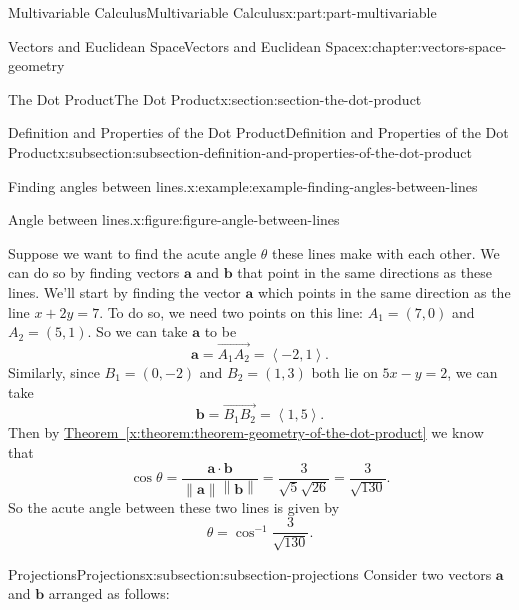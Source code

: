 \documentclass[twoside,10pt,]{tufte-book}
\newcommand{\xreffont}{\relax}
\numberwithin{equation}{part}
\newcommand{\norm}[1]{\left\| #1 \right\|}
\newcommand{\dotprod}[1]{\left\langle #1 \right\rangle}
\begin{document}
\begin{partptx}{Multivariable Calculus}{}{Multivariable Calculus}{}{}{x:part:part-multivariable}
\begin{chapterptx}{Vectors and Euclidean Space}{}{Vectors and Euclidean Space}{}{}{x:chapter:vectors-space-geometry}
\begin{sectionptx}{The Dot Product}{}{The Dot Product}{}{}{x:section:section-the-dot-product}
\begin{subsectionptx}{Definition and Properties of the Dot Product}{}{Definition and Properties of the Dot Product}{}{}{x:subsection:subsection-definition-and-properties-of-the-dot-product}
\begin{example}{Finding angles between lines.}{x:example:example-finding-angles-between-lines}
\begin{figureptx}{Angle between lines.}{x:figure:figure-angle-between-lines}{}
\begin{image}{0.1}{0.8}{0.1}
{
}%
\end{image}%
\tcblower
\end{figureptx}%
Suppose we want to find the acute angle \(\theta\) these lines make with each other. We can do so by finding vectors \(\mathbf{a}\) and \(\mathbf{b}\) that point in the same directions as these lines. We'll start by finding the vector \(\mathbf{a}\) which points in the same direction as the line \(x+2y=7\). To do so, we need two points on this line: \(A_{1} = (7,0)\) and \(A_{2} = (5,1)\). So we can take \(\mathbf{a}\) to be%
%
\begin{equation*}
\mathbf{a} = \overrightarrow{A_{1}A_{2}} = \dotprod{-2,1}.
\end{equation*}
Similarly, since \(B_{1} = (0,-2)\) and \(B_{2} = (1,3)\) both lie on \(5x-y = 2\), we can take%
%
\begin{equation*}
\mathbf{b} = \overrightarrow{B_{1}B_{2}} = \dotprod{1,5}.
\end{equation*}
Then by \hyperref[x:theorem:theorem-geometry-of-the-dot-product]{Theorem~{\xreffont\ref{x:theorem:theorem-geometry-of-the-dot-product}}} we know that%
%
\begin{equation*}
\cos\theta = \frac{\mathbf{a}\cdot\mathbf{b}}{\norm{\mathbf{a}}\norm{\mathbf{b}}} = \frac{3}{\sqrt{5}\sqrt{26}} = \frac{3}{\sqrt{130}}.
\end{equation*}
So the acute angle between these two lines is given by%
%
\begin{equation*}
\theta = \cos^{-1}\frac{3}{\sqrt{130}}.
\end{equation*}
\end{example}
\end{subsectionptx}
%
%
\typeout{************************************************}
\typeout{************************************************}
%
\begin{subsectionptx}{Projections}{}{Projections}{}{}{x:subsection:subsection-projections}
Consider two vectors \(\mathbf{a}\) and \(\mathbf{b}\) arranged as follows:%

\end{subsectionptx}
\end{sectionptx}
\end{chapterptx}
\end{partptx}
\end{document}
